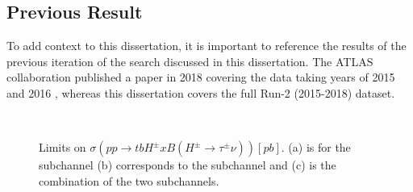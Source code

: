 	\subsection{Previous Result}\label{ssec:Prev Hpm}
		To add context to this dissertation, it is important to reference the results of the previous iteration of the search discussed in this dissertation. The ATLAS collaboration published a paper in 2018 covering the data taking years of 2015 and 2016 \cite{hpm-previous}, whereas this dissertation covers the full Run-2 (2015-2018) dataset. 
		\begin{figure}[!ht]
			\centering
			 \\
			\caption{\label{fig:hpm-prev-limits} Limits on $\sigma(pp \rightarrow tbH^{\pm} x B(H^{\pm} \rightarrow \tau^\pm \nu)) [pb]$. (a) is for the \taujets subchannel (b) corresponds to the \taulep subchannel and (c) is the combination of the two subchannels. \cite{hpm-previous} }
		\end{figure}
